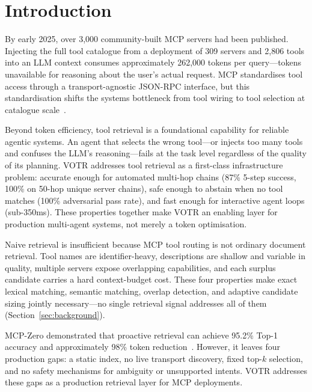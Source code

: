 \documentclass[sigconf,anonymous,review]{acmart}
\newcommand{\votr}{\textsc{VOTR}\xspace}
\newcommand{\mcpzero}{MCP-Zero\xspace}
\begin{document}
\maketitle

\section{Introduction}

By early 2025, over 3,000 community-built MCP servers had been published.
Injecting the full tool catalogue from a deployment of 309 servers and 2,806 tools
into an LLM context consumes approximately 262,000 tokens per query---tokens
unavailable for reasoning about the user's actual request.
MCP standardises tool access through a transport-agnostic JSON-RPC interface, but
this standardisation shifts the systems bottleneck from tool wiring to tool
selection at catalogue scale~\cite{anthropic_mcp2024,mcpzero2025}.

Beyond token efficiency, tool retrieval is a foundational capability for reliable
agentic systems.
An agent that selects the wrong tool---or injects too many tools and confuses the
LLM's reasoning---fails at the task level regardless of the quality of its planning.
\votr addresses tool retrieval as a first-class infrastructure problem: accurate
enough for automated multi-hop chains (87\% 5-step success, 100\% on 50-hop unique
server chains), safe enough to abstain when no tool matches (100\% adversarial pass
rate), and fast enough for interactive agent loops (sub-350ms).
These properties together make \votr an enabling layer for production multi-agent
systems, not merely a token optimisation.

Naive retrieval is insufficient because MCP tool routing is not ordinary document
retrieval.
Tool names are identifier-heavy, descriptions are shallow and variable in quality,
multiple servers expose overlapping capabilities, and each surplus candidate carries
a hard context-budget cost.
These four properties make exact lexical matching, semantic matching, overlap
detection, and adaptive candidate sizing jointly necessary---no single retrieval
signal addresses all of them (Section~\ref{sec:background}).

\mcpzero demonstrated that proactive retrieval can achieve 95.2\% Top-1 accuracy
and approximately 98\% token reduction~\cite{mcpzero2025}.
However, it leaves four production gaps: a static index, no live transport
discovery, fixed top-$k$ selection, and no safety mechanisms for ambiguity or
unsupported intents.
\votr addresses these gaps as a production retrieval layer for MCP deployments.
\end{document}
